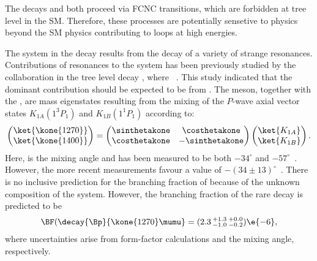 
The decays \btokpipimumu and \btophikmumu both proceed via \decay{\bquark}{\squark\mumu} FCNC
transitions, which are forbidden at tree level in the SM.
Therefore, these processes are potentially sensetive to physics beyond the SM physics contributing
to loops at high energies.

The \kpipi system in the decay \btokpipimumu results from the decay of a variety of strange
resonances.
Contributions of resonances to the \kpipi system has been previously studied by the \belle collaboration
in the tree level decay \btojpsikpipi, where \jpsitomumu~\cite{Guler:2010if}.
This study indicated that the dominant contribution should be expected
to be from .
The  meson, together with the , are mass eigenstates resulting from the
mixing of the $P$-wave axial vector states $K_{1A}(1^3P_1)$ and $K_{1B}(1^1P_1)$ according to:
\begin{equation}
  \begin{pmatrix}
    \ket{\kone{1270}} \\
    \ket{\kone{1400}}
  \end{pmatrix}
  =
  \begin{pmatrix}
    \sinthetakone & \costhetakone \\
    \costhetakone & -\sinthetakone
  \end{pmatrix}
  \begin{pmatrix}
    \ket{K_{1A}} \\
    \ket{K_{1B}}
  \end{pmatrix}.
  \label{eq:k1mixing}
\end{equation}
Here, \thetakone is the mixing angle and has been measured to be both $-34^\circ$ and
$-57^\circ$~\cite{PhysRevD.47.1252,Tayduganov:2011ui,Hatanaka:2008xj,Cheng:2011pb,Divotgey:2013jba,Cheng:2013cwa}.
However, the more recent measurements favour a value of
$-(34\pm13)^\circ$~\cite{Hatanaka:2008xj,Cheng:2011pb,Divotgey:2013jba,Cheng:2013cwa}.
There is no inclusive prediction for the branching fraction of \btokpipimumu because of the unknown
composition of the \kpipi system.
However, the branching fraction of the rare decay  is predicted to
be~\cite{Hatanaka:2008gu}
\begin{equation}
  \BF(\decay{\Bp}{\kone{1270}\mumu} = (2.3\,^{+1.3}_{-1.0}\,^{+0.0}_{-0.2})\e{-6},
\end{equation}
where uncertainties arise from form-factor calculations and the mixing angle, respectively.



